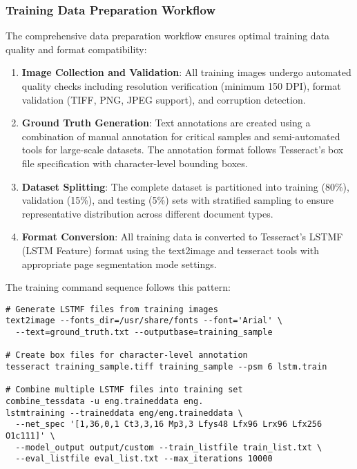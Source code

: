 \subsubsection{Training Data Preparation Workflow}

The comprehensive data preparation workflow ensures optimal training data quality and format compatibility:

\begin{enumerate}
\item \textbf{Image Collection and Validation}: All training images undergo automated quality checks including resolution verification (minimum 150 DPI), format validation (TIFF, PNG, JPEG support), and corruption detection.

\item \textbf{Ground Truth Generation}: Text annotations are created using a combination of manual annotation for critical samples and semi-automated tools for large-scale datasets. The annotation format follows Tesseract's box file specification with character-level bounding boxes.

\item \textbf{Dataset Splitting}: The complete dataset is partitioned into training (80\%), validation (15\%), and testing (5\%) sets with stratified sampling to ensure representative distribution across different document types.

\item \textbf{Format Conversion}: All training data is converted to Tesseract's LSTMF (LSTM Feature) format using the text2image and tesseract tools with appropriate page segmentation mode settings.
\end{enumerate}

The training command sequence follows this pattern:

\begin{verbatim}
# Generate LSTMF files from training images
text2image --fonts_dir=/usr/share/fonts --font='Arial' \
  --text=ground_truth.txt --outputbase=training_sample

# Create box files for character-level annotation
tesseract training_sample.tiff training_sample --psm 6 lstm.train

# Combine multiple LSTMF files into training set
combine_tessdata -u eng.traineddata eng.
lstmtraining --traineddata eng/eng.traineddata \
  --net_spec '[1,36,0,1 Ct3,3,16 Mp3,3 Lfys48 Lfx96 Lrx96 Lfx256 O1c111]' \
  --model_output output/custom --train_listfile train_list.txt \
  --eval_listfile eval_list.txt --max_iterations 10000
\end{verbatim}

